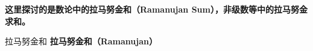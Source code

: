 

\textbf{这里探讨的是数论中的拉马努金和（Ramanujan Sum），非级数等中的拉马努金求和。}

\begin{definition}{拉马努金和}
\textbf{拉马努金和（Ramanujan）}
\end{definition}